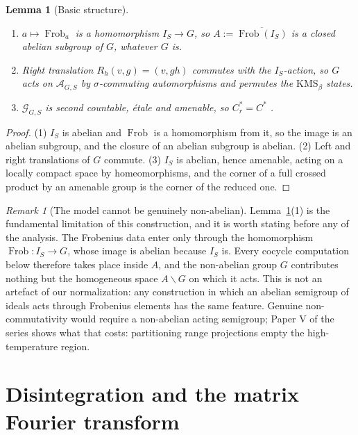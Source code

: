 \documentclass[11pt]{amsart}
\numberwithin{equation}{section}
\newtheorem{lemma}[theorem]{Lemma}
\theoremstyle{definition}
\theoremstyle{remark}
\newtheorem{remark}[theorem]{Remark}
\newcommand{\cA}{\mathcal{A}}
\newcommand{\cG}{\mathcal{G}}
\newcommand{\Frob}{\operatorname{Frob}}
\begin{document}
\begin{lemma}[Basic structure]\label{lem:basic}
\begin{enumerate}
\item $a\mapsto\Frob_a$ is a homomorphism $I_S\to G$, so
$A:=\overline{\Frob(I_S)}$ is a closed \emph{abelian} subgroup of $G$, whatever $G$ is.
\item Right translation $R_h(v,g)=(v,gh)$ commutes with the $I_S$-action, so $G$ acts on
$\cA_{G,S}$ by $\sigma$-commuting automorphisms and permutes the $\mathrm{KMS}_\beta$ states.
\item $\cG_{G,S}$ is second countable, étale and amenable, so $C^*_r=C^*$ \cite{Renault}.
\end{enumerate}
\end{lemma}

\begin{proof}
(1) $I_S$ is abelian and $\Frob$ is a homomorphism from it, so the image is an abelian
subgroup, and the closure of an abelian subgroup is abelian. (2) Left and right translations
of $G$ commute. (3) $I_S$ is abelian, hence amenable, acting on a locally compact space by homeomorphisms,
and the corner of a full crossed product by an amenable group is the corner of the reduced
one.
\end{proof}

\begin{remark}[The model cannot be genuinely non-abelian]\label{rem:abelian}
Lemma~\ref{lem:basic}(1) is the fundamental limitation of this construction, and it is worth
stating before any of the analysis. The Frobenius data enter only through the homomorphism
$\Frob:I_S\to G$, whose image is abelian because $I_S$ is. Every cocycle computation below
therefore takes place inside $A$, and the non-abelian group $G$ contributes nothing but the
homogeneous space $A\backslash G$ on which it acts. This is not an artefact of our
normalization: any construction in which an abelian semigroup of ideals acts through
Frobenius elements has the same feature. Genuine non-commutativity would require a
non-abelian acting semigroup; Paper V of the series shows what that costs: partitioning
range projections empty the high-temperature region.
\end{remark}

\section{Disintegration and the matrix Fourier transform}
\end{document}
